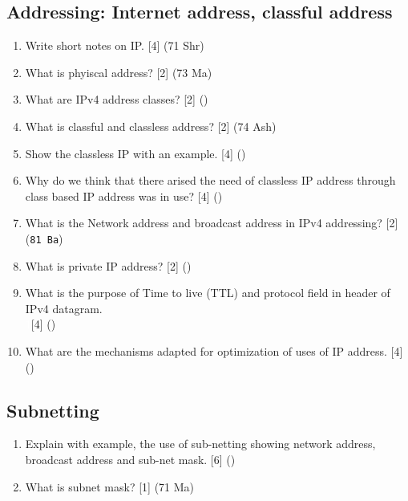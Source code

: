 \documentclass[12pt]{article}
\newcommand{\enter}{\\\textcolor{white}{1}}
\begin{document}
	\subsection{Addressing: Internet address, classful address}
		\begin{enumerate}[noitemsep, topsep=0pt]
			\item Write short notes on IP. \hfill [4] (71 Shr)

			\item What is phyiscal address? \hfill [2] (73 Ma)

			\item What are IPv4 address classes? \hfill [2] ()

			\item What is classful and classless address? \hfill [2] (74 Ash)

			\item Show the classless IP with an example. \hfill [4] ()

			\item Why do we think that there arised the need of classless IP address through class based IP address was in use? \hfill [4] ()

			\item What is the Network address and broadcast address in IPv4 addressing? \hfill [2] (\texttt{81 Ba})

			\item What is private IP address? \hfill [2] ()

			\item What is the purpose of Time to live (TTL) and protocol field in header of IPv4 datagram.
			\enter\hfill [4] ()

			\item What are the mechanisms adapted for optimization of uses of IP address. \hfill [4] ()
		\end{enumerate}

	\subsection{Subnetting}
		\begin{enumerate}
			\item Explain with example, the use of sub-netting showing network address, broadcast address and sub-net mask. \hfill [6] ()

			\item What is subnet mask? \hfill [1] (71 Ma)
		\end{enumerate}
\end{document}
